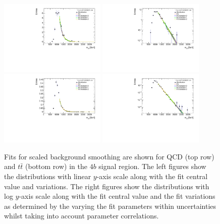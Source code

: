 \begin{figure}[htbp!]
\begin{center}
\includegraphics[angle=270, width=0.45\textwidth]{figures/boosted/Smooth/qcd_est_FourTag_Signal_mHH_pole.pdf}
\includegraphics[angle=270, width=0.45\textwidth]{figures/boosted/Smooth/qcd_est_FourTag_Signal_mHH_pole_l.pdf}\\
%   
\includegraphics[angle=270, width=0.45\textwidth]{figures/boosted/Smooth/ttbar_est_FourTag_Signal_mHH_pole.pdf}
\includegraphics[angle=270, width=0.45\textwidth]{figures/boosted/Smooth/ttbar_est_FourTag_Signal_mHH_pole_l.pdf}\\
\caption{Fits for scaled background smoothing are shown for QCD (top row) and $t\bar{t}$ (bottom row) in the $4b$ signal region.  The left figures show the distributions with linear $y$-axis scale along with the fit central value and variations. The right figures show the  distributions with log $y$-axis scale along with the fit central value and the fit variations as determined by the varying the fit parameters within uncertainties whilst taking into account parameter correlations. }
\label{fig:signal-region-mjjscaled-4b-smoothing}
\end{center}
\end{figure}

